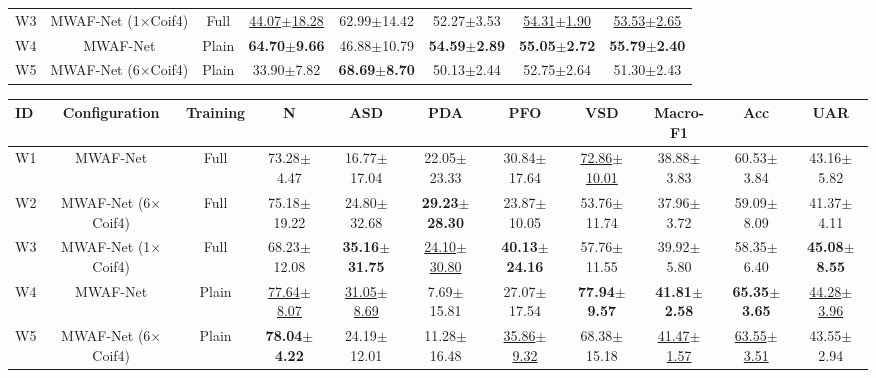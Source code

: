\begin{table}[H]
\begin{tabular*}{\linewidth}{@{\extracolsep{\fill}}lccccccc@{}}
W3 & MWAF-Net (1$\times$Coif4) & Full & \underline{44.07$\pm$18.28} & 62.99$\pm$14.42 & 52.27$\pm$3.53 & \underline{54.31$\pm$1.90} & \underline{53.53$\pm$2.65}\\
W4 & MWAF-Net & Plain & \textbf{64.70$\pm$9.66} & 46.88$\pm$10.79 & \textbf{54.59$\pm$2.89} & \textbf{55.05$\pm$2.72} & \textbf{55.79$\pm$2.40}\\
W5 & MWAF-Net (6$\times$Coif4) & Plain & 33.90$\pm$7.82 & \textbf{68.69$\pm$8.70} & 50.13$\pm$2.44 & 52.75$\pm$2.64 & 51.30$\pm$2.43\\
\bottomrule\end{tabular*}
\endgroup
{}
\begingroup
\fontsize{8.5}{10.2}\selectfont
\setlength{\tabcolsep}{1.4pt}\renewcommand{\arraystretch}{1.04}
\begin{tabular*}{\linewidth}{@{\extracolsep{\fill}}lcccccccccc@{}}\toprule
\textbf{ID} & \textbf{Configuration} & \textbf{Training} & \textbf{N} & \textbf{ASD} & \textbf{PDA} & \textbf{PFO} & \textbf{VSD} & \textbf{Macro-F1} & \textbf{Acc} & \textbf{UAR}\\\midrule
W1 & MWAF-Net & Full & 73.28$\pm$4.47 & 16.77$\pm$17.04 & 22.05$\pm$23.33 & 30.84$\pm$17.64 & \underline{72.86$\pm$10.01} & 38.88$\pm$3.83 & 60.53$\pm$3.84 & 43.16$\pm$5.82\\
W2 & MWAF-Net (6$\times$Coif4) & Full & 75.18$\pm$19.22 & 24.80$\pm$32.68 & \textbf{29.23$\pm$28.30} & 23.87$\pm$10.05 & 53.76$\pm$11.74 & 37.96$\pm$3.72 & 59.09$\pm$8.09 & 41.37$\pm$4.11\\
W3 & MWAF-Net (1$\times$Coif4) & Full & 68.23$\pm$12.08 & \textbf{35.16$\pm$31.75} & \underline{24.10$\pm$30.80} & \textbf{40.13$\pm$24.16} & 57.76$\pm$11.55 & 39.92$\pm$5.80 & 58.35$\pm$6.40 & \textbf{45.08$\pm$8.55}\\
W4 & MWAF-Net & Plain & \underline{77.64$\pm$8.07} & \underline{31.05$\pm$8.69} & 7.69$\pm$15.81 & 27.07$\pm$17.54 & \textbf{77.94$\pm$9.57} & \textbf{41.81$\pm$2.58} & \textbf{65.35$\pm$3.65} & \underline{44.28$\pm$3.96}\\
W5 & MWAF-Net (6$\times$Coif4) & Plain & \textbf{78.04$\pm$4.22} & 24.19$\pm$12.01 & 11.28$\pm$16.48 & \underline{35.86$\pm$9.32} & 68.38$\pm$15.18 & \underline{41.47$\pm$1.57} & \underline{63.55$\pm$3.51} & 43.55$\pm$2.94\\
\bottomrule\end{tabular*}
\endgroup
{}
\end{table}

